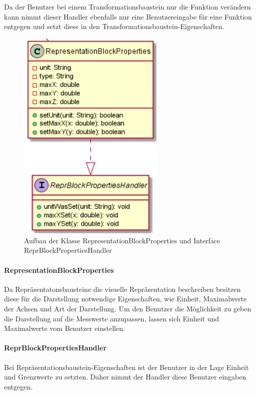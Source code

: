 \documentclass[parskip=full]{scrartcl}
\begin{document}
Da der Benutzer bei einem Transformationsbaustein nur die Funktion verändern kann nimmt dieser Handler ebenfalls nur eine Benutzereingabe für eine Funktion entgegen und setzt diese in den Transformationsbaustein-Eigenschaften.

\begin{figure}[htbp]
	\begin{center}
		\includegraphics[width = 7cm]{Grafiken/View/RepresentationBlockProperties.png}
		\caption{Aufbau der Klasse RepresentationBlockProperties und Interface ReprBlockPropertiesHandler}
		\label{RepresentationBlockProperties}
	\end{center}
\end{figure}

\paragraph{RepresentationBlockProperties}

Da Repräsentatonsbausteine die visuelle Repräsentation beschreiben besitzen diese für die Darstellung notwendige Eigenschaften, wie Einheit, Maximalwerte der Achsen und Art der Darstellung. Um den Benutzer die Möglichkeit zu geben die Darstellung auf die Messwerte anzupassen, lassen sich Einheit und Maximalwerte vom Benutzer einstellen.

\paragraph{ReprBlockPropertiesHandler}

Bei Repräsentationsbaustein-Eigenschaften ist der Benutzer in der Lage Einheit und Grenzwerte zu setzten. Daher nimmt der Handler diese Benutzer eingaben entgegen.
\end{document}
